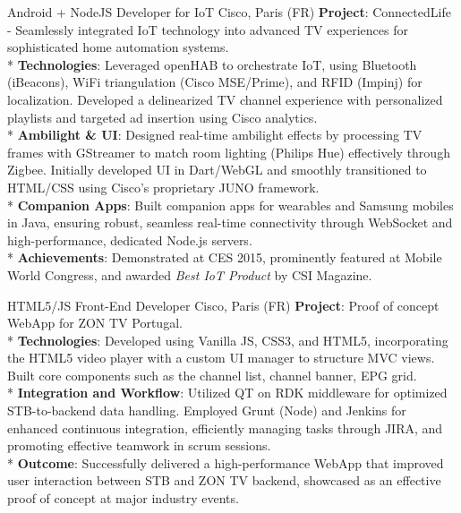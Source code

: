\documentclass[
  a4paper,
   maincolor=cvblue,
   sectioncolor=cvblue,
]{fortysecondscv}
\begin{document}
\begin{cvtable}
    {Android + NodeJS Developer for IoT}
    {Cisco, Paris (FR)}
    {
      \textbf{Project}: ConnectedLife - Seamlessly integrated IoT technology into advanced TV experiences for sophisticated home automation systems.\\
      * \textbf{Technologies}: Leveraged openHAB to orchestrate IoT, using Bluetooth (iBeacons), WiFi triangulation (Cisco MSE/Prime), and RFID (Impinj) for localization. Developed a delinearized TV channel experience with personalized playlists and targeted ad insertion using Cisco analytics.\\
      * \textbf{Ambilight \& UI}: Designed real-time ambilight effects by processing TV frames with GStreamer to match room lighting (Philips Hue) effectively through Zigbee. Initially developed UI in Dart/WebGL and smoothly transitioned to HTML/CSS using Cisco’s proprietary JUNO framework.\\
      * \textbf{Companion Apps}: Built companion apps for wearables and Samsung mobiles in Java, ensuring robust, seamless real-time connectivity through WebSocket and high-performance, dedicated Node.js servers.\\
      * \textbf{Achievements}: Demonstrated at CES 2015, prominently featured at Mobile World Congress, and awarded \textit{Best IoT Product} by CSI Magazine.\\
    }
\end{cvtable}







\begin{cvtable}
    {HTML5/JS Front-End Developer}
    {Cisco, Paris (FR)}
    {
      \textbf{Project}: Proof of concept WebApp for ZON TV Portugal.\\
      * \textbf{Technologies}: Developed using Vanilla JS, CSS3, and HTML5, incorporating the HTML5 video player with a custom UI manager to structure MVC views. Built core components such as the channel list, channel banner, EPG grid.\\
      * \textbf{Integration and Workflow}: Utilized QT on RDK middleware for optimized STB-to-backend data handling. Employed Grunt (Node) and Jenkins for enhanced continuous integration, efficiently managing tasks through JIRA, and promoting effective teamwork in scrum sessions.\\
      * \textbf{Outcome}: Successfully delivered a high-performance WebApp that improved user interaction between STB and ZON TV backend, showcased as an effective proof of concept at major industry events.
    }
\end{cvtable}
\end{document}
